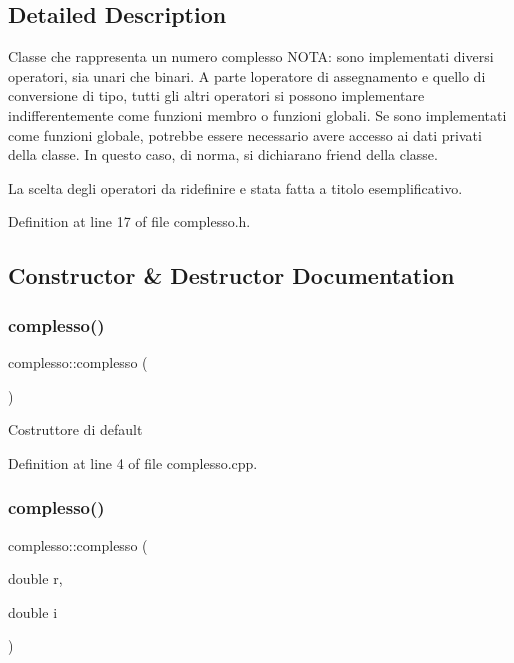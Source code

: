 \subsection{Detailed Description}
Classe che rappresenta un numero complesso N\+O\+TA\+: sono implementati diversi operatori, sia unari che binari. A parte l\textquotesingle{}operatore di assegnamento e quello di conversione di tipo, tutti gli altri operatori si possono implementare indifferentemente come funzioni membro o funzioni globali. Se sono implementati come funzioni globale, potrebbe essere necessario avere accesso ai dati privati della classe. In questo caso, di norma, si dichiarano friend della classe.

La scelta degli operatori da ridefinire e\textquotesingle{} stata fatta a titolo esemplificativo. 

Definition at line 17 of file complesso.\+h.



\subsection{Constructor \& Destructor Documentation}
\mbox{\label{structcomplesso_ac8649cdc2a8bb50ab28b57745f3e5bb1}} 
\subsubsection{\texorpdfstring{complesso()}{complesso()}\hspace{0.1cm}{\footnotesize\ttfamily [1/3]}}
{\footnotesize\ttfamily complesso\+::complesso (\begin{DoxyParamCaption}{ }\end{DoxyParamCaption})}

Costruttore di default 

Definition at line 4 of file complesso.\+cpp.

\mbox{\label{structcomplesso_a05ead874809d0266245c2b1cb650ff6f}} 
\subsubsection{\texorpdfstring{complesso()}{complesso()}\hspace{0.1cm}{\footnotesize\ttfamily [2/3]}}
{\footnotesize\ttfamily complesso\+::complesso (\begin{DoxyParamCaption}\item[{double}]{r,  }\item[{double}]{i }\end{DoxyParamCaption})}

